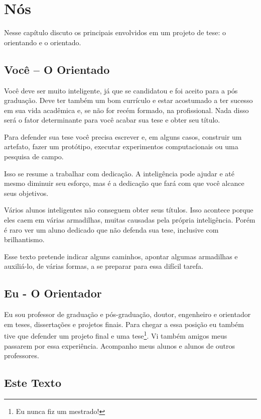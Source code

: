 \chapter{Nós}

Nesse capítulo discuto os principais envolvidos em um projeto de tese: o orientando e o orientado.

\section{Você – O Orientado}

Você deve ser muito inteligente, já que se candidatou e foi aceito para a pós graduação. Deve ter também um bom currículo e estar acostumado a ter sucesso em sua vida acadêmica e, se não for recém formado, na profissional.
Nada disso será o fator determinante para você acabar sua tese e obter seu título.

Para defender sua tese você precisa escrever e, em alguns casos, construir um artefato, fazer um protótipo, executar experimentos computacionais ou uma pesquisa de campo.

Isso se resume a trabalhar com dedicação. A inteligência pode ajudar e até mesmo diminuir seu esforço, mas é a dedicação que fará com que você alcance seus objetivos.

Vários alunos inteligentes não conseguem obter seus títulos. Isso acontece porque eles caem em várias armadilhas, muitas causadas pela própria inteligência. Porém é raro ver um aluno dedicado que não defenda sua tese, inclusive com brilhantismo.

Esse texto pretende indicar alguns caminhos, apontar algumas armadilhas e auxiliá-lo, de várias formas, a se preparar para essa difícil tarefa.

\section{Eu - O Orientador}

Eu sou professor de graduação e pós-graduação, doutor, engenheiro e orientador em teses, dissertações e projetos finais. Para chegar a essa posição eu também tive que defender um projeto final e uma tese\footnote{Eu nunca fiz um mestrado!}. Vi também amigos meus passarem por essa experiência. Acompanho meus alunos e alunos de outros professores.

\section{Este Texto}

